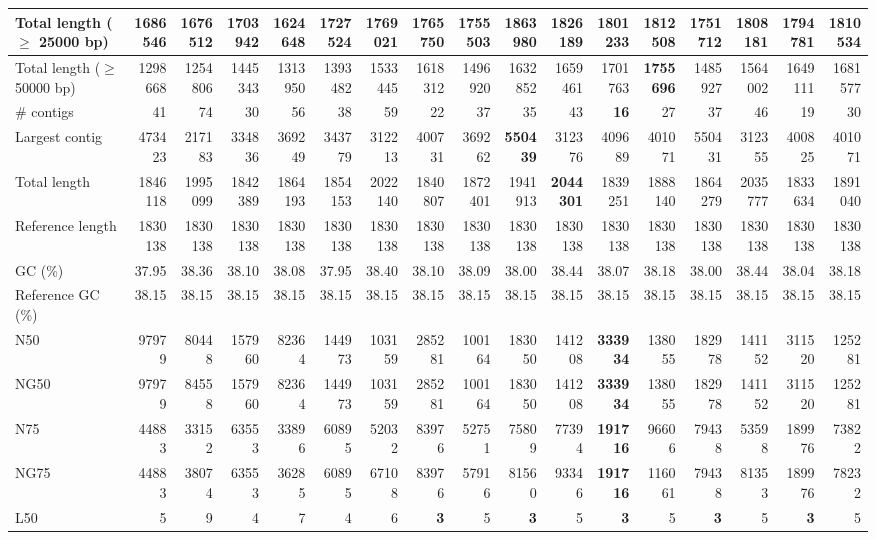 \documentclass[12pt,a4paper]{article}
\begin{document}
\begin{table}[ht]
\begin{center}
\begin{tabular}{|l*{16}{|r}|}
Total length ($\geq$ 25000 bp) & 1686546 & 1676512 & 1703942 & 1624648 & 1727524 & 1769021 & 1765750 & 1755503 & {\bf 1863980} & 1826189 & 1801233 & 1812508 & 1751712 & 1808181 & 1794781 & 1810534 \\ \hline
Total length ($\geq$ 50000 bp) & 1298668 & 1254806 & 1445343 & 1313950 & 1393482 & 1533445 & 1618312 & 1496920 & 1632852 & 1659461 & 1701763 & {\bf 1755696} & 1485927 & 1564002 & 1649111 & 1681577 \\ \hline
\# contigs & 41 & 74 & 30 & 56 & 38 & 59 & 22 & 37 & 35 & 43 & {\bf 16} & 27 & 37 & 46 & 19 & 30 \\ \hline
Largest contig & 473423 & 217183 & 334836 & 369249 & 343779 & 312213 & 400731 & 369262 & {\bf 550439} & 312376 & 409689 & 401071 & 550431 & 312355 & 400825 & 401071 \\ \hline
Total length & 1846118 & 1995099 & 1842389 & 1864193 & 1854153 & 2022140 & 1840807 & 1872401 & 1941913 & {\bf 2044301} & 1839251 & 1888140 & 1864279 & 2035777 & 1833634 & 1891040 \\ \hline
Reference length & 1830138 & 1830138 & 1830138 & 1830138 & 1830138 & 1830138 & 1830138 & 1830138 & 1830138 & 1830138 & 1830138 & 1830138 & 1830138 & 1830138 & 1830138 & 1830138 \\ \hline
GC (\%) & 37.95 & 38.36 & 38.10 & 38.08 & 37.95 & 38.40 & 38.10 & 38.09 & 38.00 & 38.44 & 38.07 & 38.18 & 38.00 & 38.44 & 38.04 & 38.18 \\ \hline
Reference GC (\%) & 38.15 & 38.15 & 38.15 & 38.15 & 38.15 & 38.15 & 38.15 & 38.15 & 38.15 & 38.15 & 38.15 & 38.15 & 38.15 & 38.15 & 38.15 & 38.15 \\ \hline
N50 & 97979 & 80448 & 157960 & 82364 & 144973 & 103159 & 285281 & 100164 & 183050 & 141208 & {\bf 333934} & 138055 & 182978 & 141152 & 311520 & 125281 \\ \hline
NG50 & 97979 & 84558 & 157960 & 82364 & 144973 & 103159 & 285281 & 100164 & 183050 & 141208 & {\bf 333934} & 138055 & 182978 & 141152 & 311520 & 125281 \\ \hline
N75 & 44883 & 33152 & 63553 & 33896 & 60895 & 52032 & 83976 & 52751 & 75809 & 77394 & {\bf 191716} & 96606 & 79438 & 53598 & 189976 & 73822 \\ \hline
NG75 & 44883 & 38074 & 63553 & 36285 & 60895 & 67108 & 83976 & 57916 & 81560 & 93346 & {\bf 191716} & 116061 & 79438 & 81353 & 189976 & 78232 \\ \hline
L50 & 5 & 9 & 4 & 7 & 4 & 6 & {\bf 3} & 5 & {\bf 3} & 5 & {\bf 3} & 5 & {\bf 3} & 5 & {\bf 3} & 5 \\ \hline

\end{tabular}
\end{center}
\end{table}
\end{document}
